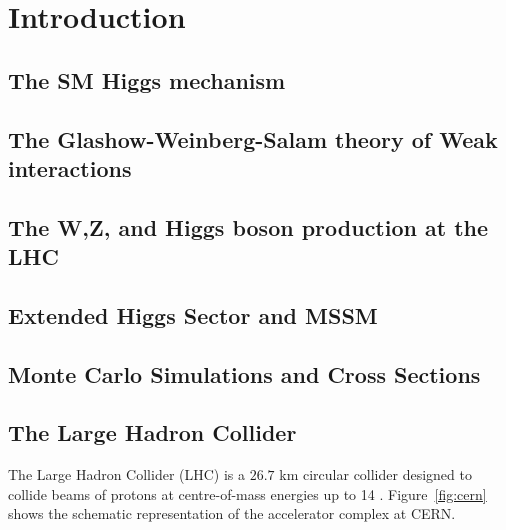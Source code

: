 \chapter{Introduction}

\section{The SM Higgs mechanism}

\section{The Glashow-Weinberg-Salam theory of Weak interactions}

\section{The W,Z, and Higgs boson production at the LHC}

\section{Extended Higgs Sector and MSSM}

\section{Monte Carlo Simulations and Cross Sections}
    
\section{The Large Hadron Collider}
The Large Hadron Collider (LHC)\cite{1748-0221-3-08-S08001} is a $26.7$ km circular collider designed to collide beams of protons at centre-of-mass energies up to 14 \TeV. Figure~\ref{fig:cern} shows the schematic representation of the accelerator complex at CERN. 

